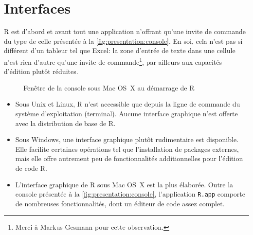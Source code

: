 \documentclass[11pt,article,french]{memoir}
\begin{document}
\section{Interfaces}
\label{sec:presentation:interfaces}

R est d'abord et avant tout une application n'offrant qu'une invite de
commande du type de celle présentée à la
\autoref{fig:presentation:console}. En soi, cela n'est pas si
différent d'un tableur tel que Excel: la zone d'entrée de texte dans
une cellule n'est rien d'autre qu'une invite de commande\footnote{%
  Merci à Markus Gesmann pour cette observation.}, par ailleurs aux
capacités d'édition plutôt réduites.

\begin{figure}
  \centering
  \caption{Fenêtre de la console sous Mac OS~X au démarrage de R}
  \label{fig:presentation:console}
\end{figure}

\begin{itemize}
\item Sous Unix et Linux, R n'est accessible que depuis la ligne de
  commande du système d'exploitation (terminal). Aucune interface
  graphique n'est offerte avec la distribution de base de R.
\item Sous Windows, une interface graphique plutôt rudimentaire est
  disponible. Elle facilite certaines opérations tel que
  l'installation de packages externes, mais elle offre autrement peu
  de fonctionnalités additionnelles pour l'édition de code R.
\item L'interface graphique de R sous Mac OS~X est la plus élaborée.
  Outre la console présentée à la
  \autoref{fig:presentation:console}, l'application \texttt{R.app}
  comporte de nombreuses fonctionnalités, dont un éditeur de code
  assez complet.
\end{itemize}
\end{document}
